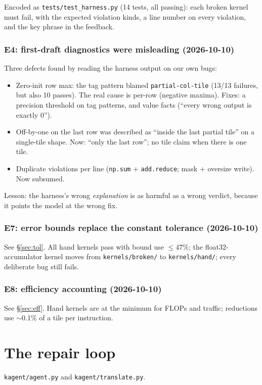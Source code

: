 \documentclass[11pt]{article}
\newcommand{\code}[1]{\texttt{#1}}
\newcommand{\entry}[2]{\subsubsection*{#1 \textnormal{\small(#2)}}}
\begin{document}
\medskip
Encoded as \code{tests/test\_harness.py} (14 tests, all passing): each broken kernel must fail,
with the expected violation kinds, a line number on every violation, and the key phrase in the
feedback.

\entry{E4: first-draft diagnostics were misleading}{2026-10-10}
Three defects found by reading the harness output on our own bugs:
\begin{itemize}
  \item Zero-init row max: the tag pattern blamed \code{partial-col-tile} (13/13 failures, but
        also 10 passes). The real cause is per-row (negative maxima). Fixes: a precision
        threshold on tag patterns, and value facts (``every wrong output is exactly 0'').
  \item Off-by-one on the last row was described as ``inside the last partial tile'' on a
        single-tile shape. Now: ``only the last row''; no tile claim when there is one tile.
  \item Duplicate violations per line (\code{np.sum} + \code{add.reduce}; mask + oversize
        write). Now subsumed.
\end{itemize}
Lesson: the harness's wrong \emph{explanation} is as harmful as a wrong verdict, because it
points the model at the wrong fix.

\entry{E7: error bounds replace the constant tolerance}{2026-10-10}
See \S\ref{sec:tol}. All hand kernels pass with bound use $\le 47\%$; the float32-accumulator
kernel moves from \code{kernels/broken/} to \code{kernels/hand/}; every deliberate bug still fails.

\entry{E8: efficiency accounting}{2026-10-10}
See \S\ref{sec:eff}. Hand kernels are at the minimum for FLOPs and traffic; reductions use
$\sim$0.1\% of a tile per instruction.

\section{The repair loop}
\label{sec:loop}

\code{kagent/agent.py} and \code{kagent/translate.py}.
\end{document}
